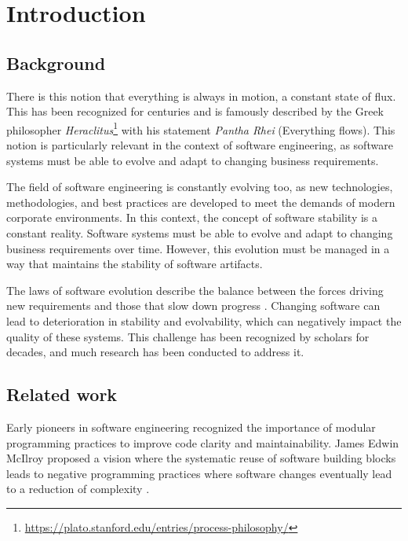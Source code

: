 \chapter{Introduction} \label{chap:introduction}

\section{Background} \label{sec:background} 

There is this notion that everything is always in motion, a constant state of flux. This
has been recognized for centuries and is famously described by the Greek philosopher
\emph{Heraclitus}\footnote{\url{https://plato.stanford.edu/entries/process-philosophy/}}
with his statement \emph{Pantha Rhei} (Everything flows). This notion is particularly
relevant in the context of software engineering, as software systems must be able to
evolve and adapt to changing business requirements.

The field of software engineering is constantly evolving too, as new technologies,
methodologies, and best practices are developed to meet the demands of modern corporate
environments. In this context, the concept of software stability is a constant reality.
Software systems must be able to evolve and adapt to changing business requirements over
time. However, this evolution must be managed in a way that maintains the stability of
software artifacts.

The laws of software evolution describe the balance between the forces driving new
requirements and those that slow down progress \citeauthor*{lehman_programs_1980}.
Changing software can lead to deterioration in stability and evolvability, which can
negatively impact the quality of these systems. This challenge has been recognized by
scholars for decades, and much research has been conducted to address it.

\section{Related work} \label{sub:related_work}

Early pioneers in software engineering recognized the importance of modular programming
practices to improve code clarity and maintainability. James Edwin McIlroy proposed a
vision where the systematic reuse of software building blocks leads to negative
programming practices where software changes eventually lead to a reduction of complexity
\parencite{p_naur_nato_1968}. 

